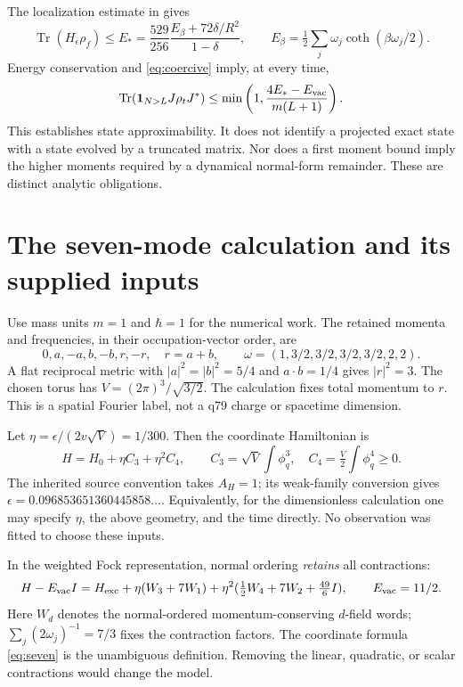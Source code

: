 \documentclass[11pt]{article}
\newcommand{\Tr}{\operatorname{Tr}}
\begin{document}
The localization estimate in \cite{WC} gives
\begin{equation}
 \Tr(H_\epsilon\rho_f)\le
 E_*=\frac{529}{256}\frac{E_\beta+72\delta/R^2}{1-\delta},
 \qquad E_\beta=\tfrac12\sum_j\omega_j\coth(\beta\omega_j/2).
\end{equation}
Energy conservation and \eqref{eq:coercive} imply, at every time,
\begin{equation}
 \Tr(\mathbf1_{N>L}J\rho_tJ^*)\le
 \min\left(1,\frac{4E_*-E_{\rm vac}}{m(L+1)}\right).
 \label{eq:tight}
\end{equation}
This establishes state approximability. It does not identify a projected
exact state with a state evolved by a truncated matrix. Nor does a first
moment bound imply the higher moments required by a dynamical
normal-form remainder. These are distinct analytic obligations.

\section{The seven-mode calculation and its supplied inputs}
Use mass units $m=1$ and $\hbar=1$ for the numerical work. The retained
momenta and frequencies, in their occupation-vector order, are
\[
 0,a,-a,b,-b,r,-r,\quad r=a+b,\qquad
 \omega=(1,3/2,3/2,3/2,3/2,2,2).
\]
A flat reciprocal metric with $|a|^2=|b|^2=5/4$ and
$a\cdot b=1/4$ gives $|r|^2=3$. The chosen torus has
$V=(2\pi)^3/\sqrt{3/2}$. The calculation fixes total momentum to $r$.
This is a spatial Fourier label, not a q79 charge or spacetime dimension.

Let $\eta=\epsilon/(2v\sqrt V)=1/300$. Then the coordinate Hamiltonian is
\begin{equation}
 H=H_0+\eta C_3+\eta^2C_4,\qquad
 C_3=\sqrt V\int\phi_q^3,\quad
 C_4=\tfrac V2\int\phi_q^4\ge0 .
 \label{eq:seven}
\end{equation}
The inherited source convention takes $A_H=1$; its weak-family conversion
gives $\epsilon=0.096853651360445858\ldots$. Equivalently, for the
dimensionless calculation one may specify $\eta$, the above geometry,
and the time directly. No observation was fitted to choose these inputs.

In the weighted Fock representation, normal ordering \emph{retains} all
contractions:
\[
 H-E_{\rm vac}I=H_{\rm exc}+
 \eta(W_3+7W_1)+\eta^2(\tfrac12W_4+7W_2+\tfrac{49}{6}I),
 \qquad E_{\rm vac}=11/2 .
\]
Here $W_d$ denotes the normal-ordered momentum-conserving $d$-field words;
$\sum_j(2\omega_j)^{-1}=7/3$ fixes the contraction factors. The coordinate
formula \eqref{eq:seven} is the unambiguous definition. Removing the
linear, quadratic, or scalar contractions would change the model.
\end{document}
